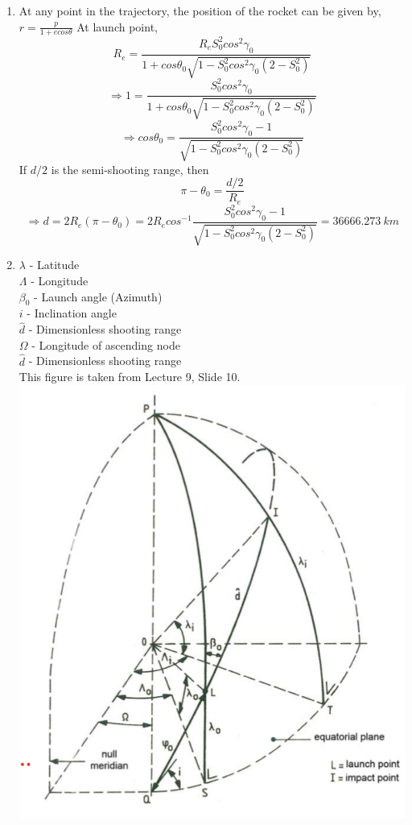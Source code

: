\begin{enumerate}[label=(\alph*)]
\item
At any point in the trajectory, the position of the rocket can be given by, $r=\frac{p}{1+ecos\theta}$
At launch point, $$R_e = \frac{R_eS_0^2cos^2\gamma_0}{1+cos\theta_0\sqrt{1-S_0^2cos^2\gamma_0(2-S_0^2)}}$$
$$\Rightarrow 1 = \frac{S_0^2cos^2\gamma_0}{1+cos\theta_0\sqrt{1-S_0^2cos^2\gamma_0(2-S_0^2)}}$$
$$\Rightarrow cos\theta_0 = \frac{S_0^2cos^2\gamma_0-1}{\sqrt{1-S_0^2cos^2\gamma_0(2-S_0^2)}}$$
If $d/2$ is the semi-shooting range, then 
$$\pi-\theta_0 = \frac{d/2}{R_e}$$
$$\Rightarrow d=2R_e(\pi-\theta_0) = 2R_ecos^{-1}\frac{S_0^2cos^2\gamma_0-1}{\sqrt{1-S_0^2cos^2\gamma_0(2-S_0^2)}}=36666.273\: km$$
 
\item
$\lambda$ - Latitude\\
$\Lambda$ - Longitude\\
$\beta_0$ - Launch angle (Azimuth)\\
$i$ - Inclination angle\\
$\hat{d}$ - Dimensionless shooting range\\
$\Omega$ - Longitude of ascending node\\
$\hat{d}$ - Dimensionless shooting range\\
This figure is taken from Lecture 9, Slide 10.\\
\includegraphics[scale=0.6]{3d}


\end{enumerate}
